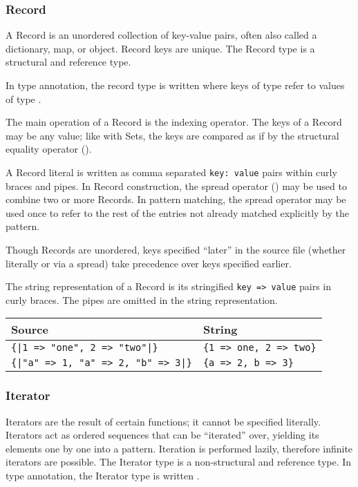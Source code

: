 \subsubsection{Record}

A Record is an unordered collection of key-value pairs, often also called
a dictionary, map, or object. Record keys are unique. The Record type is a
structural and reference type.

In type annotation, the record type is written  where keys of
type  refer to values of type .

The main operation of a Record is the indexing operator. The keys of a
Record may be any value; like with Sets, the keys are compared as if by
the structural equality operator (\op{==}).

A Record literal is written as comma separated \texttt{key: value} pairs
within curly braces and pipes. In Record construction, the spread operator ()
may be used to combine two or more Records. In pattern matching, the spread
operator may be used once to refer to the rest of the entries not already
matched explicitly by the pattern.

Though Records are unordered, keys specified ``later'' in the source file
(whether literally or via a spread) take precedence over keys specified
earlier.

The string representation of a Record is its stringified \texttt{key => value}
pairs in curly braces. The pipes are omitted in the string representation.

\begin{table}[H]
    \centering
    \begin{tabular}{ll}
        \hline
        \textbf{Source} & \textbf{String} \\
        \hline
        \texttt{\{|1 => "one", 2 => "two"|\}} & \texttt{\{1 => one, 2 => two\}} \\
        \texttt{\{|"a" => 1, "a" => 2, "b" => 3|\}} & \texttt{\{a => 2, b => 3\}} \\
        \hline
    \end{tabular}
\end{table}

\subsubsection{Iterator}
\label{sec:iterators}

Iterators are the result of certain functions; it cannot be specified literally.
Iterators act as ordered sequences that can be ``iterated'' over, yielding its
elements one by one into a pattern. Iteration is performed lazily, therefore
infinite iterators are possible. The Iterator type is a non-structural and
reference type. In type annotation, the Iterator type is written .

